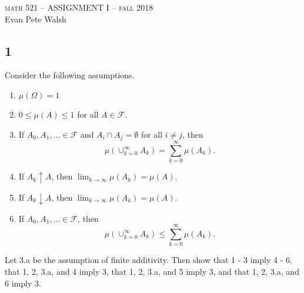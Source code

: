 \documentclass[12pt]{article}
\begin{document}
\thispagestyle{empty}
\begin{center}
  \Large \textsc{math 521 -- ASSIGNMENT I -- fall 2018} \\ 
  \vspace{5mm}
  \large Evan Pete Walsh
\end{center}



\subsection*{1}
\begin{tcolorbox}
  Consider the following assumptions.
  \begin{enumerate}
    \item $\mu(\Omega) = 1$
    \item $0\leq \mu(A) \leq 1$ for all $A \in \mathcal{F}$.
    \item If $A_0, A_1, \dots \in \mathcal{F}$ and $A_i \cap A_j = \emptyset$ for all $i \neq j$, then
      \[
        \mu( \cup_{k=0}^{\infty} A_k ) = \sum_{k=0}^{\infty} \mu(A_k).
      \]
    \item If $A_k \uparrow A$, then $\lim_{k\rightarrow \infty} \mu(A_k) = \mu(A)$.
    \item If $A_{k} \downarrow A$, then $\lim_{k \rightarrow \infty} \mu(A_{k}) = \mu(A)$.
    \item If $A_0, A_1, \dots \in \mathcal{F}$, then
      \[
        \mu( \cup_{k=0}^{\infty} A_k ) \leq \sum_{k=0}^{\infty} \mu(A_k).
      \]
  \end{enumerate}
  Let 3.a be the assumption of finite additivity. Then show that 1 - 3 imply 4 - 6, that 1, 2, 3.a, and 4 imply 3, that 1, 2, 3.a, and 5 imply 3, and that 1, 2, 3.a, and 6 imply 3.
\end{tcolorbox}
\end{document}
